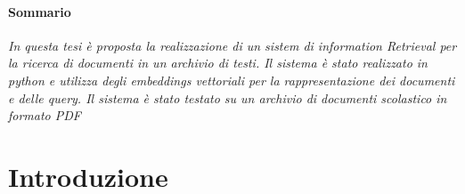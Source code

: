 
\paragraph{Sommario} 
\textit{
    In questa tesi è proposta la realizzazione di un sistem di information Retrieval per la ricerca di documenti in un archivio di testi.
    Il sistema è stato realizzato in python e utilizza degli embeddings vettoriali per la rappresentazione dei documenti e delle query. 
    Il sistema è stato testato su un archivio di documenti scolastico in formato PDF
 }

\section*{Introduzione}